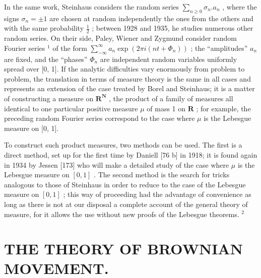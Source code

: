 In the same work, Steinhaus considers the random series \(\sum_{n\geq 0}\sigma_n.a_n\) , where the signs \(\sigma_{n} = \pm 1\) are chosen at random independently the ones from the others and with the same probability \(\frac{1}{2}\) ; between 1928 and 1935, he studies numerous other random series. On their side, Paley, Wiener and Zygmund consider random Fourier series \(^{1}\) of the form \(\sum_{-\infty}^{\infty}a_n\exp (2\pi i(nt + \varPhi_n))\) ; the ``amplitudes'' \(a_{n}\) are fixed, and the ``phases'' \(\varPhi_{n}\) are independent random variables uniformly spread over [0, 1]. If the analytic difficulties vary enormously from problem to problem, the translation in terms of measure theory is the same in all cases and represents an extension of the case treated by Borel and Steinhaus; it is a matter of constructing a measure on \(\mathbf{R}^{\mathbf{N}}\) , the product of a family of measures all identical to one particular positive measure \(\mu\) of mass 1 on \(\mathbf{R}\) ; for example, the preceding random Fourier series correspond to the case where \(\mu\) is the Lebesgue measure on [0, 1].

To construct such product measures, two methods can be used. The first is a direct method, set up for the first time by Daniell {[}76 b{]} in 1918; it is found again in 1934 by Jessen {[}173{]} who will make a detailed study of the case where \(\mu\) is the Lebesgue measure on \([0,1]\) . The second method is the search for tricks analogous to those of Steinhaus in order to reduce to the case of the Lebesgue measure on \([0,1]\) ; this way of proceeding had the advantage of convenience as long as there is not at our disposal a complete account of the general theory of measure, for it allows the use without new proofs of the Lebesgue theorems. \(^{2}\)

\section*{THE THEORY OF BROWNIAN MOVEMENT.}
{}

